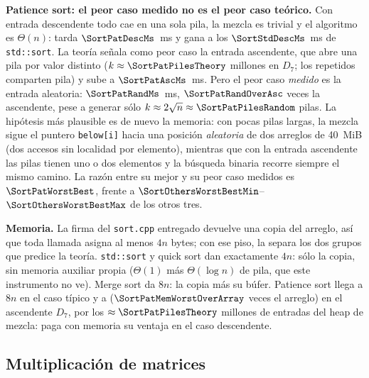 \textbf{Patience sort: el peor caso medido no es el peor caso teórico.} Con
entrada descendente todo cae en una sola pila, la mezcla es trivial y el
algoritmo es $\Theta(n)$: tarda $\SortPatDescMs$~ms y gana a los
$\SortStdDescMs$~ms de \texttt{std::sort}. La teoría señala como peor caso la
entrada ascendente, que abre una pila por valor distinto
($k\approx\SortPatPilesTheory$ millones en $D_7$; los repetidos comparten
pila) y sube a $\SortPatAscMs$~ms. Pero el peor caso \emph{medido} es la
entrada aleatoria: $\SortPatRandMs$~ms, $\SortPatRandOverAsc$ veces la
ascendente, pese a generar sólo $k\approx2\sqrt{n}\approx\SortPatPilesRandom$
pilas. La hipótesis más plausible es de nuevo la memoria: con pocas pilas
largas, la mezcla sigue el puntero \texttt{below[i]} hacia una posición
\emph{aleatoria} de dos arreglos de 40~MiB (dos accesos sin localidad por
elemento), mientras que con la entrada ascendente las pilas tienen uno o dos
elementos y la búsqueda binaria recorre siempre el mismo camino. La razón
entre su mejor y su peor caso medidos es $\SortPatWorstBest$, frente a
$\SortOthersWorstBestMin$--$\SortOthersWorstBestMax$ de los otros tres.



\textbf{Memoria.} La firma del \texttt{sort.cpp} entregado devuelve una copia
del arreglo, así que toda llamada asigna al menos $4n$ bytes; con ese piso, la
 separa los dos grupos que predice la teoría.
\texttt{std::sort} y quick sort dan exactamente $4n$: sólo la copia, sin memoria
auxiliar propia ($\Theta(1)$ más $\Theta(\log n)$ de pila, que este instrumento
no ve). Merge sort da $8n$: la copia más su búfer. Patience sort llega a $8n$
en el caso típico y a \SortPatMemWorst{} ($\SortPatMemWorstOverArray$ veces el
arreglo) en el ascendente $D_7$, por los $\approx\SortPatPilesTheory$ millones
de entradas del heap de mezcla: paga con memoria su ventaja en el caso
descendente.



\subsection{Multiplicación de matrices}



